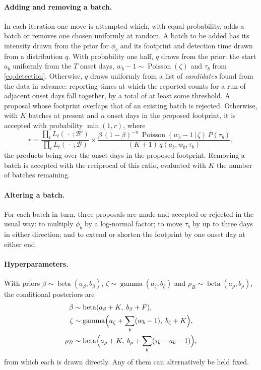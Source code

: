 \documentclass[11pt,a4paper]{article}
\newcommand{\given}{\,|\,}
\newcommand{\pois}{\operatorname{Poisson}}
\begin{document}
\paragraph{Adding and removing a batch.} In each iteration one move is
attempted which, with equal probability, adds a batch or removes one chosen
uniformly at random. A batch to be added has its intensity drawn from the
prior for $\phi_b$ and its footprint and detection time drawn from a
distribution $q$. With probability one half, $q$ draws from the prior: the
start $a_b$ uniformly from the $T$ onset days, $w_b-1\sim\pois(\zeta)$ and
$\tau_b$ from \eqref{eq:detection}. Otherwise, $q$ draws uniformly from a list
of \emph{candidates} found from the data in advance: reporting times at which
the reported counts for a run of adjacent onset days fall together, by a total
of at least some threshold. A proposal whose footprint overlaps that of an
existing batch is rejected. Otherwise, with $K$ batches at present and $n$
onset days in the proposed footprint, it is accepted with probability
$\min(1,r)$, where
\begin{equation}\label{eq:birth}
r = \frac{\prod_{t}L_t(\,\cdot\,;\mathcal{B}')}{\prod_{t}L_t(\,\cdot\,;\mathcal{B})}
\times
\frac{\beta\,(1-\beta)^{-n}\,\pois(w_b-1\given\zeta)\,P(\tau_b)}
     {(K+1)\,q(a_b,w_b,\tau_b)} ,
\end{equation}
the products being over the onset days in the proposed footprint. Removing a
batch is accepted with the reciprocal of this ratio, evaluated with $K$ the
number of batches remaining.

\paragraph{Altering a batch.} For each batch in turn, three proposals are made
and accepted or rejected in the usual way: to multiply $\phi_b$ by a
log-normal factor; to move $\tau_b$ by up to three days in either direction;
and to extend or shorten the footprint by one onset day at either end.

\paragraph{Hyperparameters.} With priors $\beta\sim\operatorname{beta}(a_\beta,b_\beta)$,
$\zeta\sim\operatorname{gamma}(a_\zeta,b_\zeta)$ and
$\rho_B\sim\operatorname{beta}(a_\rho,b_\rho)$, the conditional posteriors are
\begin{equation}
\begin{aligned}
\beta &\sim\operatorname{beta}(a_\beta+K,\;b_\beta+F),\\
\zeta &\sim\operatorname{gamma}\Bigl(a_\zeta+\sum_b (w_b-1),\;b_\zeta+K\Bigr),\\
\rho_B &\sim\operatorname{beta}\Bigl(a_\rho+K,\;b_\rho+\sum_b(\tau_b-a_b-1)\Bigr),
\end{aligned}
\end{equation}
from which each is drawn directly. Any of them can alternatively be held
fixed.
\end{document}
